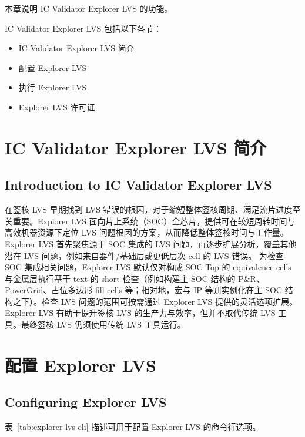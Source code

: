 \label{chap:explvs}

本章说明 IC Validator Explorer LVS 的功能。

IC Validator Explorer LVS 包括以下各节：
\begin{itemize}
  \item IC Validator Explorer LVS 简介
  \item 配置 Explorer LVS
  \item 执行 Explorer LVS
  \item Explorer LVS 许可证
\end{itemize}

\section{IC Validator Explorer LVS 简介}
\subsection*{Introduction to IC Validator Explorer LVS}

在签核 LVS 早期找到 LVS 错误的根因，对于缩短整体签核周期、满足流片进度至关重要。Explorer LVS 面向片上系统（SOC）全芯片，提供可在较短周转时间与高效机器资源下定位 LVS 问题根因的方案，从而降低整体签核时间与工作量。
Explorer LVS 首先聚焦源于 SOC 集成的 LVS 问题，再逐步扩展分析，覆盖其他潜在 LVS 问题，例如来自器件/基础层或更低层次 cell 的 LVS 错误。
为检查 SOC 集成相关问题，Explorer LVS 默认仅对构成 SOC Top 的 equivalence cells 与金属层执行基于 text 的 short 检查（例如构建主 SOC 结构的 P\&R、PowerGrid、占位多边形 fill cells 等；相对地，宏与 IP 等则实例化在主 SOC 结构之下）。检查 LVS 问题的范围可按需通过 Explorer LVS 提供的灵活选项扩展。
Explorer LVS 有助于提升签核 LVS 的生产力与效率，但并不取代传统 LVS 工具。最终签核 LVS 仍须使用传统 LVS 工具运行。

\section{配置 Explorer LVS}
\subsection*{Configuring Explorer LVS}

表~\ref{tab:explorer-lvs-cli} 描述可用于配置 Explorer LVS 的命令行选项。

